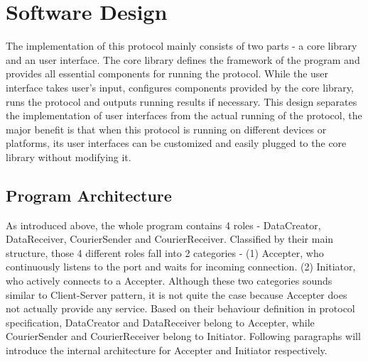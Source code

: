 \section{Software Design}
The implementation of this protocol mainly consists of two parts - a core library and an user interface. The core library defines the framework of the program and provides all essential components for running the protocol. While the user interface takes user's input, configures components provided by the core library, runs the protocol and outputs running results if necessary. This design separates the implementation of user interfaces from the actual running of the protocol, the major benefit is that when this protocol is running on different devices or platforms, its user interfaces can be customized and easily plugged to the core library without modifying it.

\subsection{Program Architecture}
As introduced above, the whole program contains 4 roles - DataCreator, DataReceiver, CourierSender and CourierReceiver. Classified by their main structure, those 4 different roles fall into 2 categories - (1) Accepter, who continuously listens to the port and waits for incoming connection. (2) Initiator, who actively connects to a Accepter. Although these two categories sounds similar to Client-Server pattern, it is not quite the case because Accepter does not actually provide any service. Based on their behaviour definition in protocol specification, DataCreator and DataReceiver belong to Accepter, while CourierSender and CourierReceiver belong to Initiator. Following paragraphs will introduce the internal architecture for Accepter and Initiator respectively.
